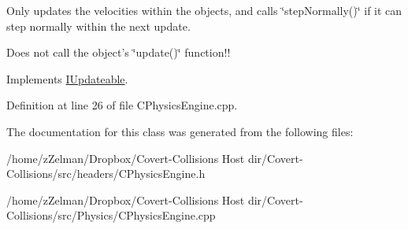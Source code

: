 Only updates the velocities within the objects, and calls \char`\"{}step\-Normally()\char`\"{} if it can step normally within the next update. 

Does not call the object's \char`\"{}update()\char`\"{} function!! 

Implements \hyperlink{classIUpdateable}{I\-Updateable}.



Definition at line 26 of file C\-Physics\-Engine.\-cpp.



The documentation for this class was generated from the following files\-:\begin{DoxyCompactItemize}
\item 
/home/z\-Zelman/\-Dropbox/\-Covert-\/\-Collisions Host dir/\-Covert-\/\-Collisions/src/headers/C\-Physics\-Engine.\-h\item 
/home/z\-Zelman/\-Dropbox/\-Covert-\/\-Collisions Host dir/\-Covert-\/\-Collisions/src/\-Physics/C\-Physics\-Engine.\-cpp\end{DoxyCompactItemize}
